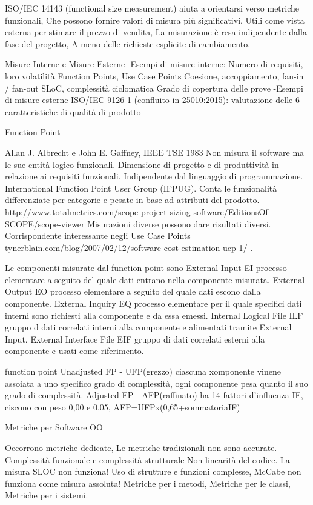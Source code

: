 \documentclass{report}
\begin{document}
ISO/IEC 14143 (functional size measurement) aiuta a orientarsi verso metriche funzionali, Che possono fornire valori di misura più significativi, Utili come vista esterna per stimare il prezzo di vendita, La misurazione è resa indipendente dalla fase del progetto, A meno delle richieste esplicite di cambiamento.


Misure Interne e Misure Esterne
-Esempi di misure interne:
Numero di requisiti, loro volatilità
Function Points, Use Case Points
Coesione, accoppiamento, fan-in / fan-out
SLoC, complessità ciclomatica
Grado di copertura delle prove
-Esempi di misure esterne
ISO/IEC 9126-1 (confluito in 25010:2015): valutazione delle 6
caratteristiche di qualità di prodotto

Function Point

Allan J. Albrecht e John E. Gaffney, IEEE TSE 1983
Non misura il software ma le sue entità logico-funzionali.
Dimensione di progetto e di produttività in relazione ai requisiti funzionali.
Indipendente dal linguaggio di programmazione.
International Function Point User Group (IFPUG).
Conta le funzionalità differenziate per categorie e pesate in base ad
attributi del prodotto.
http://www.totalmetrics.com/scope-project-sizing-software/EditionsOf-SCOPE/scope-viewer
Misurazioni diverse possono dare risultati diversi.
Corrispondente interessante negli Use Case Points tynerblain.com/blog/2007/02/12/software-cost-estimation-ucp-1/ .

Le componenti misurate dal function point sono
External Input EI processo elementare a seguito del quale dati entrano nella componente misurata.
External Output EO processo elementare a seguito del quale dati escono dalla componente.
External Inquiry EQ processo elementare per il quale specifici dati interni sono richiesti alla componente e da essa emessi.
Internal Logical File ILF gruppo d dati correlati interni alla componente e alimentati tramite External Input.
External Interface File EIF gruppo di dati correlati esterni alla componente e usati come riferimento.

function point
Unadjusted FP - UFP(grezzo) ciascuna xomponente vinene assoiata a uno specifico grado di complessità, ogni componente pesa quanto il suo grado di complessità.
Adjusted FP - AFP(raffinato) ha 14 fattori d'influenza IF, ciscono con peso 0,00 e 0,05, AFP=UFPx(0,65+sommatoriaIF)

Metriche per Software OO

Occorrono metriche dedicate, Le metriche tradizionali non sono accurate.
Complessità funzionale e complessità strutturale
Non linearità del codice. La misura SLOC non funziona!
Uso di strutture e funzioni complesse, McCabe non funziona come misura assoluta!
Metriche per i metodi, Metriche per le classi, Metriche per i sistemi.
\end{document}

